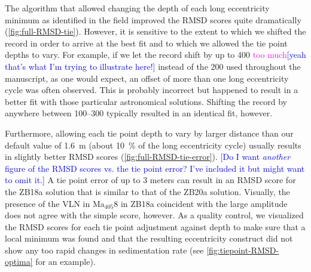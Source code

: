 \documentclass[draft]{agujournal2019}
\newcommand{\ma}[1]{Ma\(_{405}\)#1} %
\newcommand{\rez}{\textcolor{magenta}}
\newcommand{\ijk}{\textcolor{blue}}
\begin{document}
The algorithm that allowed changing the depth of each long eccentricity minimum as identified in the field improved the \gls{RMSD} scores quite dramatically (\cref{fig:full-RMSD-tie}).
However, it is sensitive to the extent to which we shifted the record in order to arrive at the best fit and to which we allowed the tie point depths to vary.
For example, if we let the record shift by up to \qty{400}{\kiloyear} \rez{too much}\ijk{[yeah that's what I'm trying to illustrate here!]} instead of the \qty{200}{\kiloyear} used throughout the manuscript, as one would expect, an offset of more than one long eccentricity cycle was often observed.
This is probably incorrect but happened to result in a better fit with those particular astronomical solutions.
Shifting the record by anywhere between \qtyrange{100}{300}{\kiloyear} typically resulted in an identical fit, however.

Furthermore, allowing each tie point depth to vary by larger distance than our default value of \qty{1.6}{\metre} (about \qty{10}{\percent} of the long eccentricity cycle) usually results in slightly better \gls{RMSD} scores (\cref{fig:full-RMSD-tie-error}).
\ijk{[Do I want \emph{another} figure of the RMSD scores vs. the tie point error? I've included it but might want to omit it.]}
A tie point error of up to 3 meters can result in an \gls{RMSD} score for the ZB18a solution that is similar to that of the ZB20a solution.
Visually, the presence of the \gls{VLN} in \ma{8} in ZB18a coincident with the large amplitude does not agree with the simple score, however.
As a quality control, we visualized the \gls{RMSD} scores for each tie point adjustment against depth to make sure that a local minimum was found and that the resulting eccentricity construct did not show any too rapid changes in sedimentation rate (see \cref{fig:tiepoint-RMSD-optima} for an example).

\end{document}

